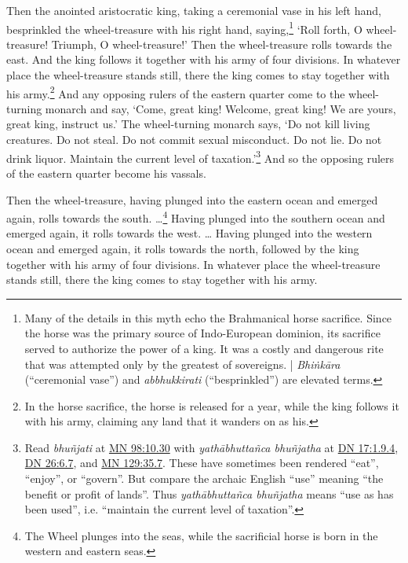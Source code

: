\documentclass[12pt,openany]{book}%
\begin{document}
Then the anointed aristocratic king, taking a ceremonial vase in his left hand, besprinkled the wheel-treasure with his right hand, saying,\footnote{Many of the details in this myth echo the Brahmanical horse sacrifice. Since the horse was the primary source of Indo-European dominion, its sacrifice served to authorize the power of a king. It was a costly and dangerous rite that was attempted only by the greatest of sovereigns. | \textit{\textsanskrit{Bhiṅkāra}} (“ceremonial vase”) and \textit{abbhukkirati} (“besprinkled”) are elevated terms. } ‘Roll forth, O wheel-treasure! Triumph, O wheel-treasure!’ Then the wheel-treasure rolls towards the east. And the king follows it together with his army of four divisions. In whatever place the wheel-treasure stands still, there the king comes to stay together with his army.\footnote{In the horse sacrifice, the horse is released for a year, while the king follows it with his army, claiming any land that it wanders on as his. } And any opposing rulers of the eastern quarter come to the wheel-turning monarch and say, ‘Come, great king! Welcome, great king! We are yours, great king, instruct us.’ The wheel-turning monarch says, ‘Do not kill living creatures. Do not steal. Do not commit sexual misconduct. Do not lie. Do not drink liquor. Maintain the current level of taxation.’\footnote{Read \textit{\textsanskrit{bhuñjati}} at \href{https://suttacentral.net/mn98/en/sujato\#10.30}{MN 98:10.30} with \textit{\textsanskrit{yathābhuttañca} \textsanskrit{bhuñjatha}} at \href{https://suttacentral.net/dn17/en/sujato\#1.9.4}{DN 17:1.9.4}, \href{https://suttacentral.net/dn26/en/sujato\#6.7}{DN 26:6.7}, and \href{https://suttacentral.net/mn129/en/sujato\#35.7}{MN 129:35.7}. These have sometimes been rendered “eat”, “enjoy”, or “govern”. But compare the archaic English “use” meaning “the benefit or profit of lands”. Thus \textit{\textsanskrit{yathābhuttañca} \textsanskrit{bhuñjatha}} means “use as has been used”, i.e. “maintain the current level of taxation”. } And so the opposing rulers of the eastern quarter become his vassals. 

Then the wheel-treasure, having plunged into the eastern ocean and emerged again, rolls towards the south. …\footnote{The Wheel plunges into the seas, while the sacrificial horse is born in the western and eastern seas. } Having plunged into the southern ocean and emerged again, it rolls towards the west. … Having plunged into the western ocean and emerged again, it rolls towards the north, followed by the king together with his army of four divisions. In whatever place the wheel-treasure stands still, there the king comes to stay together with his army. 
\end{document}
